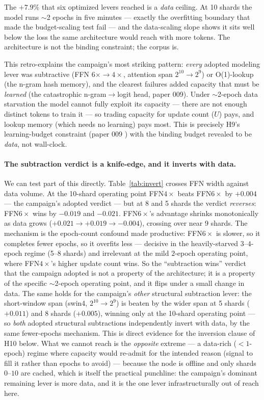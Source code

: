 \documentclass{article}
\begin{document}
The $+7.9\%$ that six optimized levers reached is a \emph{data} ceiling. At 10 shards the model runs $\sim$2 epochs in five minutes --- exactly the overfitting boundary that made the budget-scaling test fail --- and the data-scaling slope shows it sits well below the loss the same architecture would reach with more tokens. The architecture is not the binding constraint; the corpus is.

This retro-explains the campaign's most striking pattern: \emph{every} adopted modeling lever was subtractive (FFN $6\times\to4\times$, attention span $2^{10}\to2^{9}$) or O(1)-lookup (the n-gram hash memory), and the clearest failures added capacity that must be \emph{learned} (the catastrophic n-gram$\to$logit head, paper 009). Under $\sim$2-epoch data starvation the model cannot fully exploit its capacity --- there are not enough distinct tokens to train it --- so trading capacity for update count ($U$) pays, and lookup memory (which needs no learning) pays most. This is precisely H9's learning-budget constraint (paper 009 \cite{ophis2026floor}) with the binding budget revealed to be \emph{data}, not wall-clock.

\paragraph{The subtraction verdict is a knife-edge, and it inverts with data.} We can test part of this directly. Table~\ref{tab:invert} crosses FFN width against data volume. At the 10-shard operating point FFN$4\times$ beats FFN$6\times$ by $+0.004$ --- the campaign's adopted verdict --- but at 8 and 5 shards the verdict \emph{reverses}: FFN$6\times$ wins by $-0.019$ and $-0.021$. FFN$6\times$'s advantage shrinks monotonically as data grows ($+0.021\to+0.019\to-0.004$), crossing over near 9 shards. The mechanism is the epoch-count confound made productive: FFN$6\times$ is slower, so it completes fewer epochs, so it overfits less --- decisive in the heavily-starved $3$--$4$-epoch regime (5--8 shards) and irrelevant at the mild $2$-epoch operating point, where FFN$4\times$'s higher update count wins. So the ``subtraction wins'' verdict that the campaign adopted is not a property of the architecture; it is a property of the specific $\sim$2-epoch operating point, and it flips under a small change in data. The same holds for the campaign's \emph{other} structural subtraction lever: the short-window span (swin4, $2^{10}\to2^{9}$) is beaten by the wider span at 5 shards ($+0.011$) and 8 shards ($+0.005$), winning only at the 10-shard operating point --- so \emph{both} adopted structural subtractions independently invert with data, by the same fewer-epochs mechanism. This is direct evidence for the inversion clause of H10 below. What we cannot reach is the \emph{opposite} extreme --- a data-rich ($<1$-epoch) regime where capacity would re-admit for the intended reason (signal to fill it rather than epochs to avoid) --- because the node is offline and only shards $0$--$10$ are cached, which is itself the practical punchline: the campaign's dominant remaining lever is more data, and it is the one lever infrastructurally out of reach here.
\end{document}
